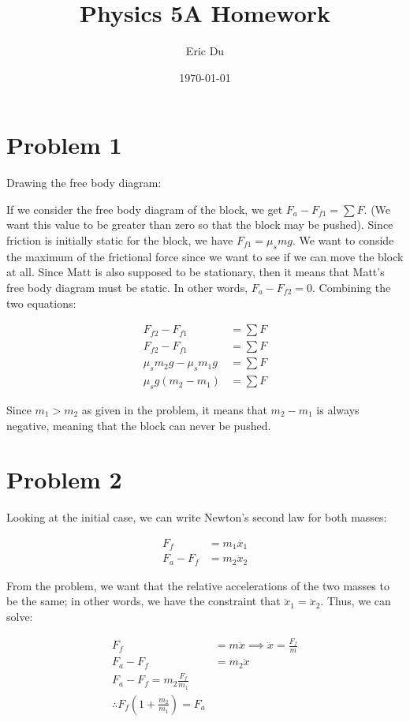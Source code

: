 \documentclass{article}
\title{Physics 5A Homework}
\author{Eric Du}
\date{\today}
\theoremstyle{definition}
\numberwithin{equation}{section}
\numberwithin{definition}{section}
\begin{document}
	\maketitle
	\tableofcontents
	\section{Problem 1}
	
	Drawing the free body diagram:
	
	
	If we consider the free body diagram of the block, we get $F_{a} - F_{f1}  = \sum F$. (We want this value to be greater than zero so that the block may be pushed). Since friction is initially static for the block, we have $F_{f1} = \mu_s mg$. We want to conside the maximum of the frictional force since we want to see if we can move the block at all. Since Matt is also supposed to be stationary, then it means that Matt's free body diagram must be static. In other words, $F_{a} - F_{f2} = 0$. Combining the two equations:
	
	\begin{align*}
		F_{f2} - F_{f1} &= \sum{F}\\
		F_{f2} - F_{f1} &= \sum F\\
		\mu_s m_2g - \mu_s m_1g &= \sum F\\
		\mu_sg(m_2 - m_1) &= \sum F
	\end{align*}


	Since $m_1 > m_2$ as given in the problem, it means that $m_2-m_1$ is always negative, meaning that the block can never be pushed. 
	
	\section{Problem 2}
	
	Looking at the initial case, we can write Newton's second law for both masses:
	
	\begin{align*}
		F_f &= m_1\ddot{x_1}\\
		F_a - F_f &= m_2 \ddot x_2
	\end{align*}

	From the problem, we want that the relative accelerations of the two masses to be the same; in other words, we have the constraint that $\ddot x_1 = \ddot x_2$. Thus, we can solve:
	
	\begin{align*}
		F_f &= m\ddot x \implies \ddot x = \frac{F_f}{m}\\
		F_a - F_f &= m_2 \ddot x \\
		F_a - F_f = m_2\frac{F_f}{m_1}\\
		\therefore F_f\left(1 + \frac{m_2}{m_1}\right) = F_a
	\end{align*}
\end{document}
